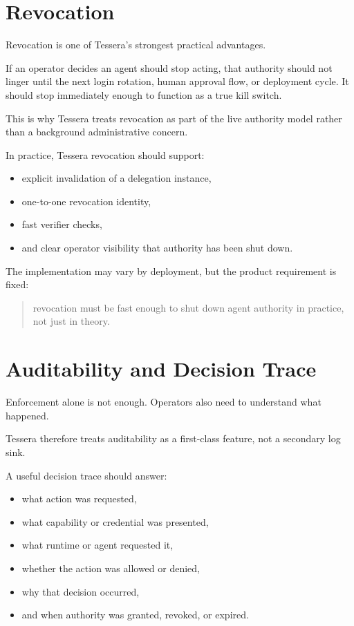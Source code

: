 \documentclass[11pt, a4paper]{article}
\begin{document}
\section{Revocation}

Revocation is one of Tessera's strongest practical advantages.

If an operator decides an agent should stop acting, that authority should not linger until the next login rotation, human approval flow, or deployment cycle. It should stop immediately enough to function as a true kill switch.

This is why Tessera treats revocation as part of the live authority model rather than a background administrative concern.

In practice, Tessera revocation should support:

\begin{itemize}
  \item explicit invalidation of a delegation instance,
  \item one-to-one revocation identity,
  \item fast verifier checks,
  \item and clear operator visibility that authority has been shut down.
\end{itemize}

The implementation may vary by deployment, but the product requirement is fixed:

\begin{quote}
revocation must be fast enough to shut down agent authority in practice, not just in theory.
\end{quote}

\section{Auditability and Decision Trace}

Enforcement alone is not enough. Operators also need to understand what happened.

Tessera therefore treats auditability as a first-class feature, not a secondary log sink.

A useful decision trace should answer:

\begin{itemize}
  \item what action was requested,
  \item what capability or credential was presented,
  \item what runtime or agent requested it,
  \item whether the action was allowed or denied,
  \item why that decision occurred,
  \item and when authority was granted, revoked, or expired.
\end{itemize}
\end{document}
